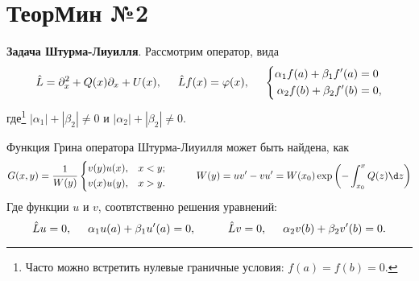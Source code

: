 \newpage
\section*{ТеорМин №2}

\textbf{Задача Штурма-Лиуилля}. Рассмотрим оператор, вида
\begin{equation*}
    \hat{L} = \partial_x^2 + Q(x) \partial_x + U(x),
    \hspace{5 mm} 
    \hat{L} f(x) = \varphi(x),
    \hspace{5 mm} 
    \left\{\begin{aligned}
        \alpha_1 f(a) + \beta_1 f'(a) &= 0 \\
        \alpha_2 f(b) + \beta_2 f'(b) &= 0,
    \end{aligned}\right.
\end{equation*}
где\footnote{
    Часто можно встретить нулевые граничные условия: $f(a) = f(b) = 0$. 
}  $|\alpha_1| + |\beta_2| \neq 0$ и $|\alpha_2| + |\beta_2| \neq 0$.

Функция Грина оператора Штурма-Лиуилля может быть найдена, как
\begin{equation*}
    G(x, y) = \frac{1}{W(y)} \left\{\begin{aligned}
        &v(y) u(x), &x < y; \\
        &v(x) u(y), &x > y.
    \end{aligned}\right.
    \hspace{10 mm} 
    W(y) = u v' - v u' =
    W(x_0) \exp\left(
        - \int_{x_0}^{x}  Q(z) \d z
    \right)
\end{equation*}
Где функции $u$ и $v$, соотвтственно решения уравнений:
\begin{equation*}
    \hat{L} u = 0, \hspace{5 mm} \alpha_1 u(a) + \beta_1 u'(a) = 0,
    \hspace{10 mm} 
    \hat{L} v = 0, \hspace{5 mm}  \alpha_2 v(b) + \beta_2 v'(b) = 0.
\end{equation*}


